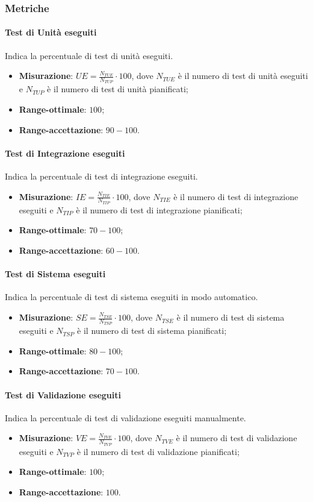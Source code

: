 \subsubsection{Metriche}
\paragraph{Test di Unità eseguiti}
Indica la percentuale di test di unità eseguiti.
\begin{itemize}
\item \textbf{Misurazione}: $UE=\frac{N_{TUE}}{N_{TUP}} \cdot 100$, dove $N_{TUE}$ è il numero di test di unità eseguiti e $N_{TUP}$ è il numero di test di unità pianificati;
\item \textbf{Range-ottimale}: $100$;
\item \textbf{Range-accettazione}: $90 - 100$.
\end{itemize}
\paragraph{Test di Integrazione eseguiti}
Indica la percentuale di test di integrazione eseguiti.
\begin{itemize}
\item \textbf{Misurazione}: $IE=\frac{N_{TIE}}{N_{TIP}} \cdot 100$, dove $N_{TIE}$ è il numero di test di integrazione eseguiti e $N_{TIP}$ è il numero di test di integrazione pianificati;
\item \textbf{Range-ottimale}: $70 - 100$;
\item \textbf{Range-accettazione}: $60 - 100$.
\end{itemize}
\paragraph{Test di Sistema eseguiti}
Indica la percentuale di test di sistema eseguiti in modo automatico.
\begin{itemize}
\item \textbf{Misurazione}: $SE=\frac{N_{TSE}}{N_{TSP}} \cdot 100$, dove $N_{TSE}$ è il numero di test di sistema eseguiti e $N_{TSP}$ è il numero di test di sistema pianificati;
\item \textbf{Range-ottimale}: $80 - 100$;
\item \textbf{Range-accettazione}: $70 - 100$.
\end{itemize}
\paragraph{Test di Validazione eseguiti}
Indica la percentuale di test di validazione eseguiti manualmente.
\begin{itemize}
\item \textbf{Misurazione}: $VE=\frac{N_{TVE}}{N_{TVP}} \cdot 100$, dove $N_{TVE}$ è il numero di test di validazione eseguiti e $N_{TVP}$ è il numero di test di validazione pianificati;
\item \textbf{Range-ottimale}: $100$;
\item \textbf{Range-accettazione}: $100$.
\end{itemize}
